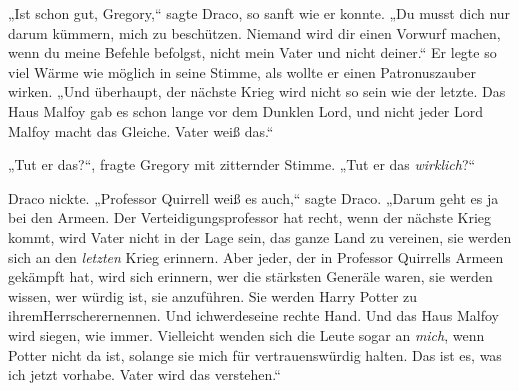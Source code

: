 „Ist schon gut, Gregory,“ sagte Draco, so sanft wie er konnte. „Du musst dich nur darum kümmern, mich zu beschützen. Niemand wird dir einen Vorwurf machen, wenn du meine Befehle befolgst, nicht mein Vater und nicht deiner.“ Er legte so viel Wärme wie möglich in seine Stimme, als wollte er einen Patronuszauber wirken. „Und überhaupt, der nächste Krieg wird nicht so sein wie der letzte. Das Haus Malfoy gab es schon lange vor dem Dunklen Lord, und nicht jeder Lord Malfoy macht das Gleiche. Vater weiß das.“

„Tut er das?“, fragte Gregory mit zitternder Stimme. „Tut er das \emph{wirklich}?“

Draco nickte. „Professor Quirrell weiß es auch,“ sagte Draco. „Darum geht es ja bei den Armeen. Der Verteidigungsprofessor hat recht, wenn der nächste Krieg kommt, wird Vater nicht in der Lage sein, das ganze Land zu vereinen, sie werden sich an den \emph{letzten} Krieg erinnern. Aber jeder, der in Professor Quirrells Armeen gekämpft hat, wird sich erinnern, wer die stärksten Generäle waren, sie werden wissen, wer würdig ist, sie anzuführen. Sie werden Harry Potter zu ihremHerrscherernennen. Und ichwerdeseine rechte Hand. Und das Haus Malfoy wird siegen, wie immer. Vielleicht wenden sich die Leute sogar an \emph{mich}, wenn Potter nicht da ist, solange sie mich für vertrauenswürdig halten. Das ist es, was ich jetzt vorhabe. Vater wird das verstehen.“

